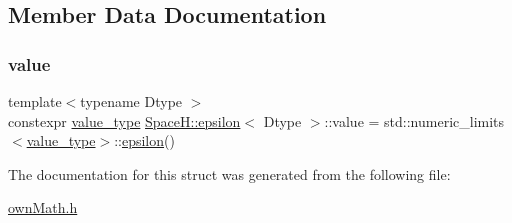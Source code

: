 \subsection{Member Data Documentation}
\mbox{\label{struct_space_h_1_1epsilon_ac5843bdc3a64016722e87809ead426bb}} 
\subsubsection{\texorpdfstring{value}{value}}
{\footnotesize\ttfamily template$<$typename Dtype $>$ \\
constexpr \mbox{\hyperlink{struct_space_h_1_1epsilon_abd3cad02e7f97ff8ed6b20b67c2ff1fc}{value\+\_\+type}} \mbox{\hyperlink{struct_space_h_1_1epsilon}{Space\+H\+::epsilon}}$<$ Dtype $>$\+::value = std\+::numeric\+\_\+limits$<$\mbox{\hyperlink{struct_space_h_1_1epsilon_abd3cad02e7f97ff8ed6b20b67c2ff1fc}{value\+\_\+type}}$>$\+::\mbox{\hyperlink{struct_space_h_1_1epsilon}{epsilon}}()\hspace{0.3cm}{\ttfamily [static]}}



The documentation for this struct was generated from the following file\+:\begin{DoxyCompactItemize}
\item 
\mbox{\hyperlink{own_math_8h}{own\+Math.\+h}}\end{DoxyCompactItemize}
